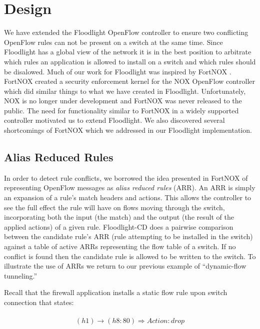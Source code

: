 \section{Design}
\label{sec:design}

We have extended the Floodlight OpenFlow controller to ensure two conflicting OpenFlow rules can not be present on a switch at the same time.
Since Floodlight has a global view of the network it is in the best position to arbitrate which rules an application is allowed to install on a switch and which rules should be disalowed.
Much of our work for Floodlight was inspired by FortNOX \cite{Porras:2012:SEK:2342441.2342466}.
FortNOX created a security enforcement kernel for the NOX OpenFlow controller \cite{Gude:2008:NTO:1384609.1384625} which did similar things to what we have created in Floodlight.
Unfortunately, NOX is no longer under development and FortNOX was never released to the public.
The need for functionality similar to FortNOX in a widely supported controller motivated us to extend Floodlight.
We also discovered several shortcomings of FortNOX which we addressed in our Floodlight implementation.

\subsection{Alias Reduced Rules}
\label{subsec:arr}
In order to detect rule conflicts, we borrowed the idea presented in FortNOX of representing OpenFlow messages as \emph{alias reduced rules} (ARR).
An ARR is simply an expansion of a rule's match headers and actions.
This allows the controller to see the full effect the rule will have on flows moving through the switch, incorporating both the input (the match) and the output (the result of the applied actions) of a given rule.
Floodlight-CD does a pairwise comparison between the candidate rule's ARR (rule attempting to be installed in the switch) against a table of active ARRs representing the flow table of a switch.
If no conflict is found then the candidate rule is allowed to be written to the switch.
To illustrate the use of ARRs we return to our previous example of ``dynamic-flow tunneling.'' 

Recall that the firewall application installs a static flow rule upon switch connection that states:

\begin{align}
\begin{aligned}
\label{eq:staticfirewall}
(h1) \rightarrow (h8:80) \Rightarrow Action: drop 
\end{aligned}
\end{align}

